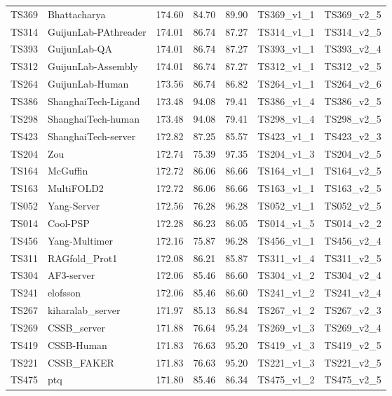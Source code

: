 \begin{table}[ht]
{\begin{tabular}{llrrrll}
TS369 & Bhattacharya & 174.60 & 84.70 & 89.90 & TS369\_v1\_1 & TS369\_v2\_5 \\ 
TS314 & GuijunLab-PAthreader & 174.01 & 86.74 & 87.27 & TS314\_v1\_1 & TS314\_v2\_5 \\ 
TS393 & GuijunLab-QA & 174.01 & 86.74 & 87.27 & TS393\_v1\_1 & TS393\_v2\_4 \\ 
TS312 & GuijunLab-Assembly & 174.01 & 86.74 & 87.27 & TS312\_v1\_1 & TS312\_v2\_5 \\ 
TS264 & GuijunLab-Human & 173.56 & 86.74 & 86.82 & TS264\_v1\_1 & TS264\_v2\_6 \\ 
TS386 & ShanghaiTech-Ligand & 173.48 & 94.08 & 79.41 & TS386\_v1\_4 & TS386\_v2\_5 \\ 
TS298 & ShanghaiTech-human & 173.48 & 94.08 & 79.41 & TS298\_v1\_4 & TS298\_v2\_5 \\ 
TS423 & ShanghaiTech-server & 172.82 & 87.25 & 85.57 & TS423\_v1\_1 & TS423\_v2\_3 \\ 
TS204 & Zou & 172.74 & 75.39 & 97.35 & TS204\_v1\_3 & TS204\_v2\_5 \\ 
TS164 & McGuffin & 172.72 & 86.06 & 86.66 & TS164\_v1\_1 & TS164\_v2\_5 \\ 
TS163 & MultiFOLD2 & 172.72 & 86.06 & 86.66 & TS163\_v1\_1 & TS163\_v2\_5 \\ 
TS052 & Yang-Server & 172.56 & 76.28 & 96.28 & TS052\_v1\_1 & TS052\_v2\_5 \\ 
TS014 & Cool-PSP & 172.28 & 86.23 & 86.05 & TS014\_v1\_5 & TS014\_v2\_2 \\ 
TS456 & Yang-Multimer & 172.16 & 75.87 & 96.28 & TS456\_v1\_1 & TS456\_v2\_4 \\ 
TS311 & RAGfold\_Prot1 & 172.08 & 86.21 & 85.87 & TS311\_v1\_4 & TS311\_v2\_5 \\ 
TS304 & AF3-server & 172.06 & 85.46 & 86.60 & TS304\_v1\_2 & TS304\_v2\_4 \\ 
TS241 & elofsson & 172.06 & 85.46 & 86.60 & TS241\_v1\_2 & TS241\_v2\_4 \\ 
TS267 & kiharalab\_server & 171.97 & 85.13 & 86.84 & TS267\_v1\_2 & TS267\_v2\_3 \\ 
TS269 & CSSB\_server & 171.88 & 76.64 & 95.24 & TS269\_v1\_3 & TS269\_v2\_4 \\ 
TS419 & CSSB-Human & 171.83 & 76.63 & 95.20 & TS419\_v1\_3 & TS419\_v2\_5 \\ 
TS221 & CSSB\_FAKER & 171.83 & 76.63 & 95.20 & TS221\_v1\_3 & TS221\_v2\_5 \\ 
TS475 & ptq & 171.80 & 85.46 & 86.34 & TS475\_v1\_2 & TS475\_v2\_5 \\ 

\end{tabular}}
\end{table}
